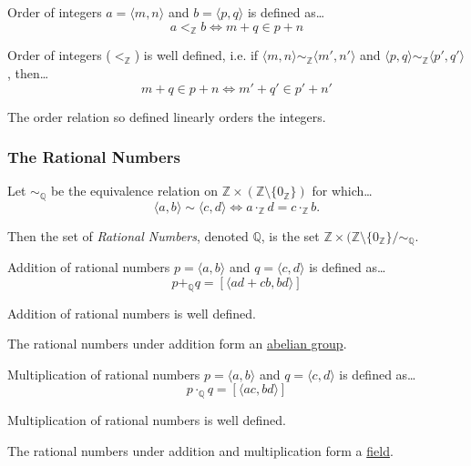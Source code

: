 Order of integers $a = \langle m, n \rangle$ and $b = \langle p, q \rangle$ is defined as\dots
$$a <_{\mathbb{Z}} b \Leftrightarrow m + q \in p + n$$

\begin{lemma}
Order of integers ($<_{\mathbb{Z}}$) is well defined, i.e. if $\langle m,n \rangle \sim_{\mathbb{Z}} \langle m',n' \rangle$ and $\langle p,q \rangle \sim_{\mathbb{Z}} \langle p',q' \rangle$, then\dots
$$m + q \in p + n \Leftrightarrow m' + q' \in p' + n'$$
\end{lemma}

\noindent The order relation so defined linearly orders the integers.

\subsubsection{The Rational Numbers}\label{rationals}

Let $\sim_{\mathbb{Q}}$ be the equivalence relation on $\mathbb{Z} \times (\mathbb{Z} \setminus \{0_{\mathbb{Z}}\})$ for which\dots
$$\langle a,b \rangle \sim \langle c,d \rangle \Leftrightarrow a \cdot_{\mathbb{Z}} d = c \cdot_{\mathbb{Z}} b.$$

\noindent Then the set of \emph{Rational Numbers}, denoted $\mathbb{Q}$, is the set $\mathbb{Z} \times (\mathbb{Z} \setminus \{ 0_{\mathbb{Z}} \} / \sim_{\mathbb{Q}}.$

Addition of rational numbers $p = \langle a, b \rangle$ and $q = \langle c, d \rangle$ is defined as\dots
$$p +_{\mathbb{Q}} q = [\langle ad+cb, bd \rangle]$$

\begin{lemma}
Addition of rational numbers is well defined.
\end{lemma}

\noindent The rational numbers under addition form an \hyperref[abeliangroupdefinition]{abelian group}.

Multiplication of rational numbers $p = \langle a, b \rangle$ and $q = \langle c, d \rangle$ is defined as\dots
$$p \cdot_{\mathbb{Q}} q = [\langle ac, bd \rangle]$$

\begin{lemma}
Multiplication of rational numbers is well defined.
\end{lemma}

\noindent The rational numbers under addition and multiplication form a \hyperref[ringtheory]{field}.

